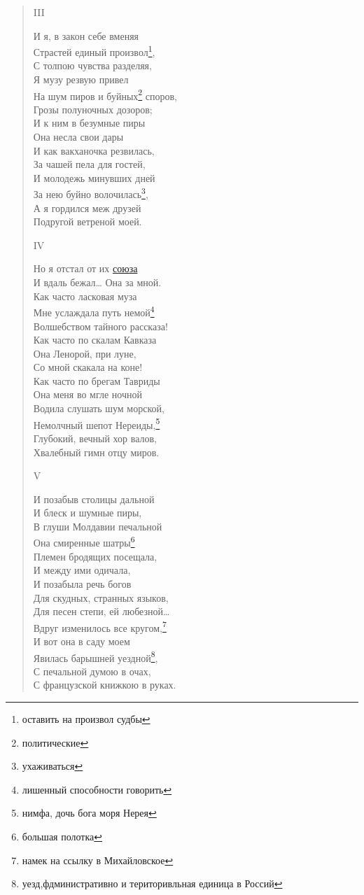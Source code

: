 \begin{verse}
III

И я, в закон себе вменяя\\
Страстей единый произвол\footnote{оставить на произвол судбы},\\
С толпою чувства разделяя,\\
Я музу резвую привел\\
На шум пиров и буйных\footnote{политические} споров,\\
Грозы полуночных дозоров;\\
И к ним в безумные пиры\\
Она несла свои дары\\
И как вакханочка резвилась,\\
За чашей пела для гостей,\\
И молодежь минувших дней\\
За нею буйно волочилась\footnote{ухаживаться},\\
А я гордился меж друзей\\
Подругой ветреной моей.

IV

Но я отстал от их \hyperref[soiuz]{союза}\\
И вдаль бежал… Она за мной.\\
Как часто ласковая муза\\
Мне услаждала путь немой\footnote{лишенный способности говорить}\\
Волшебством тайного рассказа!\\
Как часто по скалам Кавказа\\
Она Ленорой, при луне,\\
Со мной скакала на коне!\\
Как часто по брегам Тавриды\\
Она меня во мгле ночной\\
Водила слушать шум морской,\\
Немолчный шепот Нереиды,\footnote{нимфа, дочь бога моря Нерея}\\
Глубокий, вечный хор валов,\\
Хвалебный гимн отцу миров.

V

И позабыв столицы дальной\\
И блеск и шумные пиры,\\
В глуши Молдавии печальной\\
Она смиренные шатры\footnote{большая полотка}\\
Племен бродящих посещала,\\
И между ими одичала,\\
И позабыла речь богов\\
Для скудных, странных языков,\\
Для песен степи, ей любезной…\\
Вдруг изменилось все кругом,\footnote{намек на ссылку в Михайловское}\\
И вот она в саду моем\\
Явилась барышней уездной\footnote{уезд,фдминистративно и територивльная единица в Россий},\\
С печальной думою в очах,\\
С французской книжкою в руках.


\end{verse}
